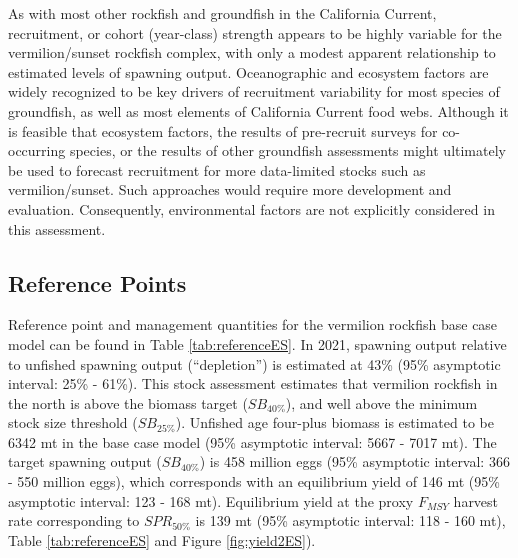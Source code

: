 \documentclass[
  english,
  a4paper,
]{article}
\begin{document}
As with most other rockfish and groundfish in the California Current, recruitment,
or cohort (year-class) strength appears to be highly variable for the vermilion/sunset
rockfish complex, with only a modest apparent relationship to estimated levels of spawning output. Oceanographic and ecosystem factors are widely recognized to be key drivers of
recruitment variability for most species of groundfish, as well as most elements
of California Current food webs. Although it is feasible that
ecosystem factors, the results of pre-recruit surveys for co-occurring species,
or the results of other groundfish assessments might ultimately be used to
forecast recruitment for more data-limited stocks such as vermilion/sunset. Such approaches would require more
development and evaluation. Consequently, environmental factors are not
explicitly considered in this assessment.

\FloatBarrier

\hypertarget{reference-points}{%
\subsection*{Reference Points}\label{reference-points}}

Reference point and management quantities for the vermilion rockfish base case
model can be found in Table \ref{tab:referenceES}. In 2021, spawning output
relative to unfished spawning output (``depletion'') is estimated at
43\% (95\% asymptotic interval:
25\% - 61\%).
This stock assessment estimates that vermilion rockfish in the north is above
the biomass target (\(SB_{40\%}\)), and well above the minimum stock size
threshold (\(SB_{25\%}\)). Unfished age four-plus biomass is estimated to be
6342 mt in the base case model (95\% asymptotic interval:
5667 - 7017 mt).
The target spawning output (\(SB_{40\%}\)) is 458 million eggs
(95\% asymptotic interval: 366 - 550 million eggs),
which corresponds with an equilibrium yield of 146 mt
(95\% asymptotic interval: 123 - 168 mt).
Equilibrium yield at the proxy \(F_{MSY}\)
harvest rate corresponding to \(SPR_{50\%}\) is 139 mt
(95\% asymptotic interval: 118 - 160 mt),
Table \ref{tab:referenceES} and Figure \ref{fig:yield2ES}).
\end{document}
